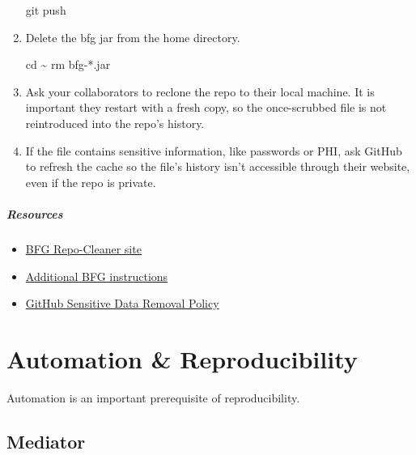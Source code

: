 \documentclass[
]{book}
\newenvironment{Shaded}{\begin{snugshade}}{\end{snugshade}}
\newcommand{\BuiltInTok}[1]{#1}
\newcommand{\FunctionTok}[1]{\textcolor[rgb]{0.00,0.00,0.00}{#1}}
\newcommand{\NormalTok}[1]{#1}
\providecommand{\tightlist}{%
  \setlength{\itemsep}{0pt}\setlength{\parskip}{0pt}}
\begin{document}
\begin{enumerate}
\begin{Shaded}
\begin{Highlighting}[]
\FunctionTok{git}\NormalTok{ push}
\end{Highlighting}
\end{Shaded}
\item
  Delete the bfg jar from the home directory.

\begin{Shaded}
\begin{Highlighting}[]
\BuiltInTok{cd}\NormalTok{ \textasciitilde{}}
\FunctionTok{rm}\NormalTok{ bfg{-}*.jar}
\end{Highlighting}
\end{Shaded}
\item
  Ask your collaborators to reclone the repo to their local machine. It is important they restart with a fresh copy, so the once-scrubbed file is not reintroduced into the repo's history.
\item
  If the file contains sensitive information, like passwords or PHI, ask GitHub to refresh the cache so the file's history isn't accessible through their website, even if the repo is private.
\end{enumerate}

\hypertarget{resources}{%
\paragraph{Resources}\label{resources}}

\begin{itemize}
\tightlist
\item
  \href{https://rtyley.github.io/bfg-repo-cleaner/}{BFG Repo-Cleaner site}
\item
  \href{https://github.com/IBM/BluePic/wiki/Using-BFG-Repo-Cleaner-tool-to-remove-sensitive-files-from-your-git-repo}{Additional BFG instructions}
\item
  \href{https://help.github.com/articles/github-sensitive-data-removal-policy/}{GitHub Sensitive Data Removal Policy}
\end{itemize}

\hypertarget{automation}{%
\chapter{Automation \& Reproducibility}\label{automation}}

Automation is an important prerequisite of reproducibility.

\hypertarget{automation-mediator}{%
\section{Mediator}\label{automation-mediator}}
\end{document}
